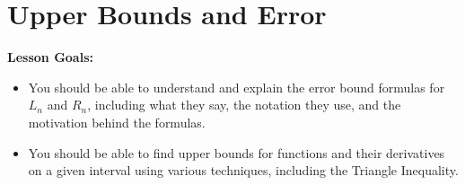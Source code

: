 \documentclass[main]{subfiles}
\begin{document}
\ifSubfilesClassLoaded{%
  \chaptermark{\chapterone}
}{}

\section{Upper Bounds and Error} \label{ws1-7}
\begin{framed}
\textbf{Lesson Goals:}
\begin{itemize}[parsep=0pt]
\item You should be able to understand and explain the error bound formulas for $L_n$ and $R_n$, including what they say, the notation they use, and the motivation behind the formulas.
\item You should be able to find upper bounds for functions and their derivatives on a given interval using various techniques, including the Triangle Inequality.
\end{itemize}
\end{framed}
\end{document}
